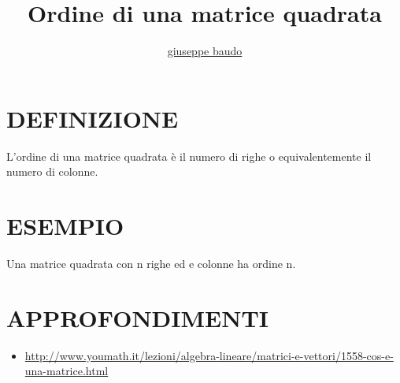 \documentclass[a4paper,10pt]{article}
\title{Ordine di una matrice quadrata}
\author{\href{http://www.baudo.hol.es}{giuseppe baudo}}
\begin{document}
\maketitle

\section{DEFINIZIONE}
L'ordine di una matrice quadrata è il numero di righe o equivalentemente il numero di colonne.

\section{ESEMPIO}
Una matrice quadrata con n righe ed e colonne ha ordine n.

\section{APPROFONDIMENTI}
\begin{itemize}
 \item \url{http://www.youmath.it/lezioni/algebra-lineare/matrici-e-vettori/1558-cos-e-una-matrice.html}
\end{itemize}
\end{document}
